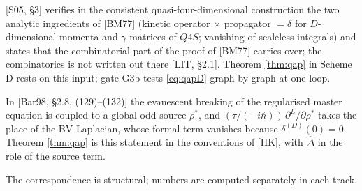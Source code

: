 \begin{axiom}
\label{ax:qapD}
[S05, §3] verifies in the consistent quasi-four-dimensional construction the two analytic ingredients of [BM77] (kinetic operator $\times$ propagator $=\delta$ for $D$-dimensional momenta and $\gamma$-matrices of $Q4S$; vanishing of scaleless integrals) and states that the combinatorial part of the proof of [BM77] carries over; the combinatorics is not written out there [LIT, §2.1]. Theorem \ref{thm:qap} in Scheme D rests on this input; gate G3b tests \eqref{eq:qapD} graph by graph at one loop.
\end{axiom}

\begin{remark}
In [Bar98, §2.8, (129)--(132)] the evanescent breaking of the regularised master equation is coupled to a global odd source $\rho^*$, and $(\tau/(-i\hbar))\,\partial^L/\partial\rho^*$ takes the place of the BV Laplacian, whose formal term vanishes because $\delta^{(D)}(0)=0$. Theorem \ref{thm:qap} is this statement in the conventions of [HK], with $\widehat\Delta$ in the role of the source term.
\end{remark}

\begin{remark}
\label{rem:dict}
\mbox{}\par\smallskip{}\par\smallskip

The correspondence is structural; numbers are computed separately in each track.
\end{remark}

